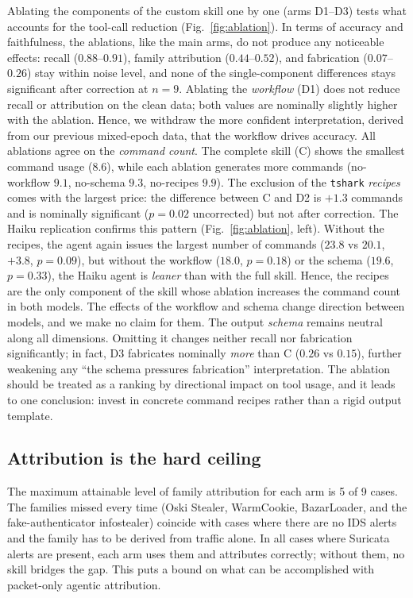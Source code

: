 \documentclass[conference]{IEEEtran}
\newcommand{\num}[1]{#1} %
\begin{document}
Ablating the components of the custom skill one by one (arms D1--D3) tests what accounts for
the tool-call reduction (Fig.~\ref{fig:ablation}). In terms of accuracy and faithfulness,
the ablations, like the main arms, do not produce any noticeable effects: recall
($0.88$--$0.91$), family attribution ($0.44$--$0.52$), and fabrication ($0.07$--$0.26$) stay
within noise level, and none of the single-component differences stays significant after
correction at $n{=}9$. Ablating the \emph{workflow} (D1) does not reduce recall or
attribution on the clean data; both values are nominally slightly higher with the ablation.
Hence, we withdraw the more confident interpretation, derived from our previous mixed-epoch
data, that the workflow drives accuracy. All ablations agree on the \emph{command count}.
The complete skill (C) shows the smallest command usage ($8.6$), while each ablation
generates more commands (no-workflow $9.1$, no-schema $9.3$, no-recipes $9.9$). The
exclusion of the \texttt{tshark} \emph{recipes} comes with the largest price: the difference
between C and D2 is $+1.3$ commands and is nominally significant ($p{=}0.02$ uncorrected)
but not after correction. The Haiku replication confirms this pattern
(Fig.~\ref{fig:ablation}, left). Without the recipes, the agent again issues the largest
number of commands ($23.8$ vs $20.1$, $+3.8$, $p{=}0.09$), but without the workflow ($18.0$,
$p{=}0.18$) or the schema ($19.6$, $p{=}0.33$), the Haiku agent is \emph{leaner} than with
the full skill. Hence, the recipes are the only component of the skill whose ablation
increases the command count in both models. The effects of the workflow and schema change
direction between models, and we make no claim for them. The output \emph{schema} remains
neutral along all dimensions. Omitting it changes neither recall nor fabrication
significantly; in fact, D3 fabricates nominally \emph{more} than C ($0.26$ vs $0.15$),
further weakening any ``the schema pressures fabrication'' interpretation. The ablation
should be treated as a ranking by directional impact on tool usage, and it leads to one
conclusion: invest in concrete command recipes rather than a rigid output template.

\subsection{Attribution is the hard ceiling}
The maximum attainable level of family attribution for each arm is \num{5} of \num{9} cases.
The families missed every time (Oski Stealer, WarmCookie, BazarLoader, and the
fake-authenticator infostealer) coincide with cases where there are no IDS alerts and the
family has to be derived from traffic alone. In all cases where Suricata alerts are present,
each arm uses them and attributes correctly; without them, no skill bridges the gap. This
puts a bound on what can be accomplished with packet-only agentic attribution.
\end{document}
